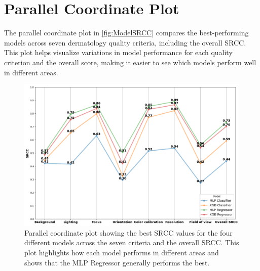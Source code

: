 \section{Parallel Coordinate Plot}
\label{sec:ParallelCoordinatePlot}
The parallel coordinate plot in \autoref{fig:ModelSRCC} compares the best-performing models across seven dermatology quality criteria, including the overall SRCC. This plot helps visualize variations in model performance for each quality criterion and the overall score, making it easier to see which models perform well in different areas. \par
\begin{figure}[ht]
    \centering
    \includegraphics[keepaspectratio,width=12.5cm]{img/Model_SRCC.png}
    \caption{Parallel coordinate plot showing the best SRCC values for the four different models across the seven criteria and the overall SRCC. This plot highlights how each model performs in different areas and shows that the MLP Regressor generally performs the best.}
    \label{fig:ModelSRCC}
\end{figure}

\clearpage
